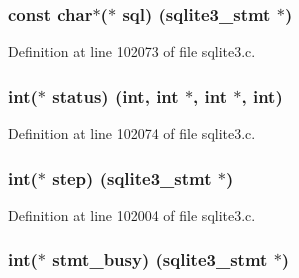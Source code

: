 \subsubsection[{sql}]{\setlength{\rightskip}{0pt plus 5cm}const char$\ast$($\ast$ sql) ({\bf sqlite3\+\_\+stmt} $\ast$)}\label{structsqlite3__api__routines_a2659f30cca776687b888db7a811642ac}


Definition at line 102073 of file sqlite3.\+c.

\hypertarget{structsqlite3__api__routines_ac5a157dacf31fbfee695baf18a8482cf}{}
\subsubsection[{status}]{\setlength{\rightskip}{0pt plus 5cm}int($\ast$ status) (int, int $\ast$, int $\ast$, int)}\label{structsqlite3__api__routines_ac5a157dacf31fbfee695baf18a8482cf}


Definition at line 102074 of file sqlite3.\+c.

\hypertarget{structsqlite3__api__routines_a60d8cfc980ce5b99515b59965dd77119}{}
\subsubsection[{step}]{\setlength{\rightskip}{0pt plus 5cm}int($\ast$ step) ({\bf sqlite3\+\_\+stmt} $\ast$)}\label{structsqlite3__api__routines_a60d8cfc980ce5b99515b59965dd77119}


Definition at line 102004 of file sqlite3.\+c.

\hypertarget{structsqlite3__api__routines_ab6ce1529912d488d417a61f585b9a2f9}{}
\subsubsection[{stmt\+\_\+busy}]{\setlength{\rightskip}{0pt plus 5cm}int($\ast$ stmt\+\_\+busy) ({\bf sqlite3\+\_\+stmt} $\ast$)}\label{structsqlite3__api__routines_ab6ce1529912d488d417a61f585b9a2f9}


